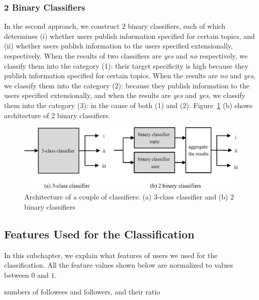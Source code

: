\subsubsection{2 Binary Classifiers}
\label{subsubsec:2-binary}

In the second approach, we construct 2 binary classifiers, each of
which determines (i) whether users publish information specified for
certain topics, and (ii) whether users publish information to the users
specified extensionally, respectively.  When the results of two
classifiers are \emph{yes} and \emph{no} respectively, we classify them
into the category (1): their target specificity is high because they
publish information specified for certain topics.  When the results are
\emph{no} and
\emph{yes}, we classify them into the category (2): because they publish
information to the users specified extensionally, and when the results
are \emph{yes}
and \emph{yes}, we classify them into the category (3): in the cause of
both (1) and (2).  Figure~\ref{fig:classifier} (b) shows architecture of
2 binary classifiers.

{\footnotesize
\begin{figure}[t]
\begin{center}
\includegraphics[width=14cm]{images/classifier.eps}
 \caption{Architecture of a couple of classifiers: (a) 3-class
 classifier and (b) 2 binary classifiers}
\label{fig:classifier}
\end{center}
\end{figure}
}

\subsection{Features Used for the Classification}
\label{subsec:Features}

In this subchapter, we explain what features of users we used for the
classification.  All the feature values shown below are normalized to
values between $0$ and $1$.

\begin{description}
\bf {\item[(i)] numbers of followees and followers, and their ratio}
\end{description}

